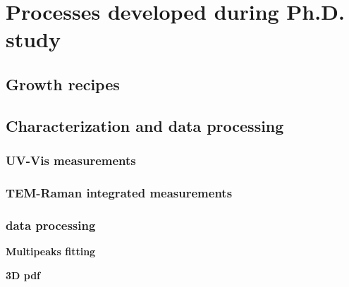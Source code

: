 \chapter{Processes developed during Ph.D. study}


\section{Growth recipes}


\section{Characterization and data processing}


\subsection{UV-Vis measurements}


\subsection{TEM-Raman integrated measurements}

\subsection{data processing}

\textbf{Multipeaks fitting}

\textbf{3D pdf} 

